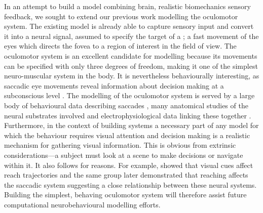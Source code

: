 \documentclass{frontiersSCNS}
\begin{document}
In an attempt to build a model combining brain, realistic
biomechanics  sensory
feedback, we sought to extend our previous work modelling the oculomotor system.
The existing model \citep{cope_basal_2017} is already able to capture sensory input
and convert it into a neural signal, assumed to specify the target of a
;
a fast movement of the eyes which directs the fovea to a region of interest
in the field of view.
%
The oculomotor system is an excellent candidate for modelling because
its movements can  be specified with only three degrees of freedom,
making it one of the simplest neuro-muscular system in the body.
%
It is nevertheless behaviourally
interesting, as saccadic eye movements reveal information about decision making at
a subconscious level
\citep{deubel_saccade_1996,reppert_modulation_2015,marcos_determining_2016}.
The modelling of the oculomotor system is served by a large body of
behavioural data describing
saccades \citep{tipper_reaching_2001,walker_effect_1997,casteau_effect_2012},
many anatomical studies of the neural substrates involved
\citep{meredith_intrinsic_1998,isa_intrinsic_2002,isa_exploring_2009}
and electrophysiological data linking these together
\citep{hepp_spatio-temporal_1983,dorris_neuronal_1997,mcpeek_competition_2003,vokoun_circuit_2011}.
Furthermore, in the context
of building  systems a
necessary part of any model for which the behaviour requires visual attention
and decision making is a realistic mechanism for gathering visual information.
This is obvious from extrinsic considerations---a
subject must look at a scene to make decisions or navigate within it. It
also follows for  reasons. For example, \cite{howard_hand_1997}
showed that visual cues affect reach trajectories and the same group later
demonstrated that reaching affects the saccadic system
\citep{tipper_reaching_2001} suggesting a close relationship between these
neural systems. Building the simplest, behaving oculomotor system will
therefore assist future computational neurobehavioural modelling efforts.
\end{document}
